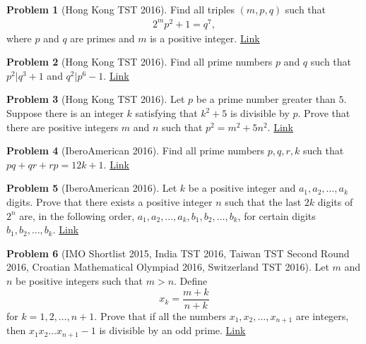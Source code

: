 \documentclass[]{article}
\theoremstyle{definition}
\newtheorem{problem}{Problem}
\begin{document}
\begin{problem}[Hong Kong TST 2016]
	Find all triples $(m,p,q)$ such that
		\begin{align*}
			2^mp^2 +1=q^7,
		\end{align*}
	where $p$ and $q$ are primes and $m$ is a positive integer. \hfill \href{http://artofproblemsolving.com/community/c6h1150516p5442572}{Link}
\end{problem}



\begin{problem}[Hong Kong TST 2016]
	Find all prime numbers $p$ and $q$ such that $p^2|q^3+1$ and $q^2|p^6-1$. \hfill \href{http://artofproblemsolving.com/community/c6h1232696p6240989}{Link}
\end{problem}




\begin{problem}[Hong Kong TST 2016]
	Let $p$ be a prime number greater than $5$. Suppose there is an integer $k$ satisfying that $k^2+5$ is divisible by $p$. Prove that there are positive integers $m$ and $n$ such that $p^2=m^2+5n^2$. \hfill \href{http://artofproblemsolving.com/community/c6h1235235p6270723}{Link}
\end{problem}




\begin{problem}[IberoAmerican 2016]
	Find all prime numbers $p,q,r,k$ such that $pq+qr+rp = 12k+1$. \hfill \href{http://artofproblemsolving.com/community/c6h1311821p7030145}{Link}
\end{problem}




\begin{problem}[IberoAmerican 2016]
	Let $k$ be a positive integer and $a_1, a_2,\dots, a_k$ digits. Prove that there exists a positive integer $n$ such that the last $2k$ digits of $2^n$ are, in the following order, $a_1, a_2,\dots, a_k , b_1, b_2, \dots, b_k$, for certain digits $b_1, b_2, \dots, b_k$. \hfill \href{http://artofproblemsolving.com/community/c6h1312214p7032871}{Link}
\end{problem}



\begin{problem}[IMO Shortlist 2015, India TST 2016, Taiwan TST Second Round 2016, Croatian Mathematical Olympiad 2016, Switzerland TST 2016]
	Let $m$ and $n$ be positive integers such that $m>n$. Define $$x_k=\frac{m+k}{n+k}$$ for $k=1,2,\ldots,n+1$. Prove that if all the numbers $x_1,x_2,\ldots,x_{n+1}$ are integers, then $x_1x_2\ldots x_{n+1}-1$ is divisible by an odd prime. \flushright \href{http://artofproblemsolving.com/community/c6h1268874p6622379}{Link}
\end{problem}
\end{document}
